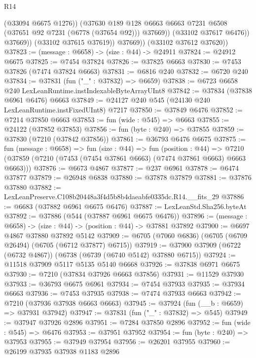 \begin{lexlean}{R14}
\begin{coremodule}
                      (@33094 @6675 @1276))
                    (@37630
                      @189
                      @128
                      @6663
                      @6663
                      @7231
                      @6508
                      (@37651 @92 @7231 (@6778 (@37654 @92)))
                      @37669))
                  (@33102 @37617 @6476))
                @37669))
            (@33102 @37615 @37619))
          @37669))
      (@33102 @37612 @37620))
@37823 := (message : @6658) -> (size : @44) -> @24911
@37824 := @24912 @6675
@37825 := @7454 @37824
@37826 := @37825 @6663
@37830 := @7453 @37826 (@7474 @37824 @6663)
@37831 := @6816 @240
@37832 := @6720 @240
@37834 := @37831 (fun ("_" : @37832) => @6659)
@37838 := @6723 @6658 @240 LexLeanRuntime.instIndexableByteArrayUInt8
@37842 := @37834 (@37838 @6961 @6476) @6663
@37849 := @24127 @240 @545 (@24130 @240 LexLeanRuntime.instFixedUInt8) @7217
@37850 := @37849 @6476
@37852 := @7214 @37850 @6663
@37853 := fun (wide : @545) => @6663
@37855 := @24122 (@37852 @37853)
@37856 := fun (byte : @240) => @37855
@37859 := @37830 (@7210 (@37842 @37856))
@37861 := @36793 @6476 @6675
@37875 := fun (message : @6658) =>
  fun (size : @44) =>
  fun (position : @44) =>
  @7210 (@37859 (@7210 (@7453 (@7454 @37861 @6663) (@7474 @37861 @6663) @6663 @6663)))
@37876 := @6673 @4867
@37877 := @237 @6961
@37878 := @6474 @37877
@37879 := @26948 @6838
@37880 := @37878 @37879
@37881 := @37876 @37880
@37882 := LexLeanPreserve.C108b20448a3f4d5b8b4daeabfe0335dc.R14.__fits_29
@37886 := @6683 (@37882 @6961 @6675 @6476)
@37887 := LexLeanStd.Sha256.byteAt
@37892 := @37886 (@544 (@37887 @6961 @6675 @6476))
@37896 := (message : @6658) -> (size : @44) -> (position : @44) -> @37881 @37892
@37900 := @6697 @4867 @37880 @37892 @5142
@37909 := @6705 (@7060 @6836) (@6705 (@6709 @26494) (@6705 (@6712 @37877) @6715))
@37919 := @37900 @37909 (@6722 (@6732 @4867)) (@6738 (@6739 (@6740 @5142) @37880 @6715))
@37924 := @11518 @37909 @5117 @5135 @5140 @6668
@37926 := @37838 @6971 @6675
@37930 := @7210 (@37834 @37926 @6663 @37856)
@37931 := @11529 @37930
@37933 := @36793 @6675 @6961
@37934 := @7454 @37933
@37935 := @37934 @6663
@37936 := @7453 @37935
@37938 := @7474 @37933 @6663
@37942 := @7210 (@37936 @37938 @6663 @6663)
@37945 := @37924 (fun (__b : @6659) => @37931 @37942)
@37947 := @37831 (fun ("_" : @37832) => @545)
@37949 := @37947 @37926 @2896
@37951 := @7284 @37850 @2896
@37952 := fun (wide : @545) => @6476
@37953 := @37951 @37952
@37954 := fun (byte : @240) => @37953
@37955 := @37949 @37954
@37956 := @26201 @37955
@37960 := @26199 @37935 @37938 @1183 @2896

\end{coremodule}
\end{lexlean}
